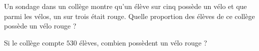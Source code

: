 
\begin{exercice}\label{exo2smath-0034}

    Un sondage dans un collège montre qu'un élève sur cinq possède un vélo et que parmi les vélos, un sur trois était rouge. Quelle proportion des élèves de ce collège possède un vélo rouge ?

    Si le collège compte \( 530\) élèves, combien possèdent un vélo rouge ?

\end{exercice}

